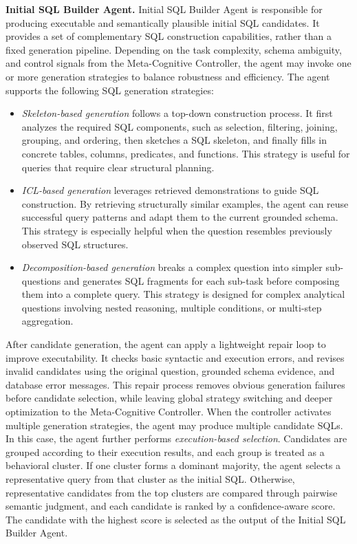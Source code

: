 \textbf{Initial SQL Builder Agent.}
Initial SQL Builder Agent is responsible for producing executable and semantically plausible initial SQL candidates.
It provides a set of complementary SQL construction capabilities, rather than a fixed generation pipeline.
Depending on the task complexity, schema ambiguity, and control signals from the Meta-Cognitive Controller, the agent may invoke one or more generation strategies to balance robustness and efficiency.
The agent supports the following SQL generation strategies:

\begin{itemize}[leftmargin=10pt]
	\item \textit{Skeleton-based generation} follows a top-down construction process.
	It first analyzes the required SQL components, such as selection, filtering, joining, grouping, and ordering, then sketches a SQL skeleton, and finally fills in concrete tables, columns, predicates, and functions.
	This strategy is useful for queries that require clear structural planning.
	
	\item \textit{ICL-based generation} leverages retrieved demonstrations to guide SQL construction.
	By retrieving structurally similar examples, the agent can reuse successful query patterns and adapt them to the current grounded schema.
	This strategy is especially helpful when the question resembles previously observed SQL structures.
	
	\item \textit{Decomposition-based generation} breaks a complex question into simpler sub-questions and generates SQL fragments for each sub-task before composing them into a complete query.
	This strategy is designed for complex analytical questions involving nested reasoning, multiple conditions, or multi-step aggregation.
\end{itemize}

After candidate generation, the agent can apply a lightweight repair loop to improve executability.
It checks basic syntactic and execution errors, and revises invalid candidates using the original question, grounded schema evidence, and database error messages.
This repair process removes obvious generation failures before candidate selection, while leaving global strategy switching and deeper optimization to the Meta-Cognitive Controller.
When the controller activates multiple generation strategies, the agent may produce multiple candidate SQLs.
In this case, the agent further performs \textit{execution-based selection}.
Candidates are grouped according to their execution results, and each group is treated as a behavioral cluster.
If one cluster forms a dominant majority, the agent selects a representative query from that cluster as the initial SQL.
Otherwise, representative candidates from the top clusters are compared through pairwise semantic judgment, and each candidate is ranked by a confidence-aware score.
The candidate with the highest score is selected as the output of the Initial SQL Builder Agent.


